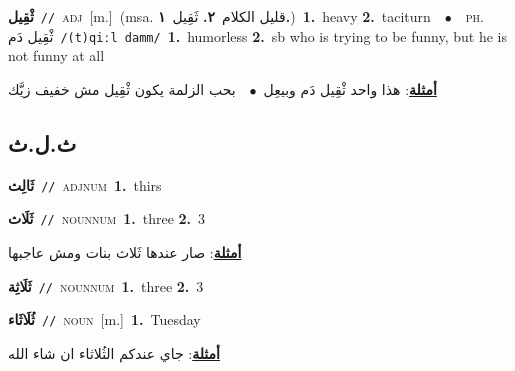 \documentclass[10pt,a4paper,twoside]{article} %
\begin{document}
\begin{multicols}{2}
{{{{{{{{\setlength\topsep{0pt}\textbf{\foreignlanguage{arabic}{ثْقِيل}}\ {\color{gray}\texttt{//}\color{black}}\ \textsc{adj}\ [m.]\ \color{gray}(msa. \foreignlanguage{arabic}{قليل الكلام}~\foreignlanguage{arabic}{\textbf{٢.}}  \foreignlanguage{arabic}{ثَقِيل}~\foreignlanguage{arabic}{\textbf{١.}})\color{black}\ \textbf{1.}~heavy  \textbf{2.}~taciturn\ \ $\bullet$\ \ \textsc{ph.} \color{gray} \foreignlanguage{arabic}{ثْقِيل دَم}\color{black}\ {\color{gray}\texttt{/{\sffamily (t)qiːl damm}/}\color{black}}\ \textbf{1.}~humorless  \textbf{2.}~sb who is trying to be funny, but he is not funny at all\  \begin{flushright}\color{gray}\foreignlanguage{arabic}{\textbf{\underline{\foreignlanguage{arabic}{أمثلة}}}: هذا واحد ثْقِيل دَم وبيعِل\ $\bullet$\ \  بحب الزلمة يكون ثْقِيل مش خفيف زيَّك}\end{flushright}\color{black}} \vspace{2mm}

\vspace{-3mm}
\subsection*{\color{blue}\foreignlanguage{arabic}{ث.ل.ث}\color{blue}{}} 

{\setlength\topsep{0pt}\textbf{\foreignlanguage{arabic}{ثَالِث}}\ {\color{gray}\texttt{//}\color{black}}\ \textsc{adj\textunderscore num}\ \textbf{1.}~thirs\ 

{\setlength\topsep{0pt}\textbf{\foreignlanguage{arabic}{ثَلَاث}}\ {\color{gray}\texttt{//}\color{black}}\ \textsc{noun\textunderscore num}\ \textbf{1.}~three  \textbf{2.}~3\  \begin{flushright}\color{gray}\foreignlanguage{arabic}{\textbf{\underline{\foreignlanguage{arabic}{أمثلة}}}: صار عندها ثَلاث بنات ومش عاجبها}\end{flushright}\color{black}} \vspace{2mm}

{\setlength\topsep{0pt}\textbf{\foreignlanguage{arabic}{ثَلَاثِة}}\ {\color{gray}\texttt{//}\color{black}}\ \textsc{noun\textunderscore num}\ \textbf{1.}~three  \textbf{2.}~3\ 

{\setlength\topsep{0pt}\textbf{\foreignlanguage{arabic}{ثُلَاثَاء}}\ {\color{gray}\texttt{//}\color{black}}\ \textsc{noun}\ [m.]\ \textbf{1.}~Tuesday\  \begin{flushright}\color{gray}\foreignlanguage{arabic}{\textbf{\underline{\foreignlanguage{arabic}{أمثلة}}}: جاي عندكم الثُلاثاء ان شاء الله}\end{flushright}\color{black}} \vspace{2mm}

}}}}}}}}}
\end{multicols}
\end{document}
